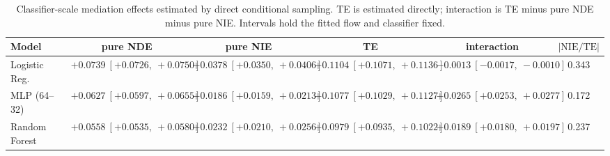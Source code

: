 \begin{table}[htbp]
  \centering
  \caption{Classifier-scale mediation effects estimated by direct conditional sampling. TE is estimated directly; interaction is TE minus pure NDE minus pure NIE. Intervals hold the fitted flow and classifier fixed.}
  \label{tab:acs_gap_overall}
  \begin{tabular}{lccccc}
    \toprule
    Model & pure NDE & pure NIE & TE & interaction & $|\mathrm{NIE}/\mathrm{TE}|$ \\
    \midrule
    Logistic Reg. & $+0.0739\ [+0.0726,\ +0.0750]$ & $+0.0378\ [+0.0350,\ +0.0406]$ & $+0.1104\ [+0.1071,\ +0.1136]$ & $-0.0013\ [-0.0017,\ -0.0010]$ & 0.343 \\
    MLP (64--32) & $+0.0627\ [+0.0597,\ +0.0655]$ & $+0.0186\ [+0.0159,\ +0.0213]$ & $+0.1077\ [+0.1029,\ +0.1127]$ & $+0.0265\ [+0.0253,\ +0.0277]$ & 0.172 \\
    Random Forest & $+0.0558\ [+0.0535,\ +0.0580]$ & $+0.0232\ [+0.0210,\ +0.0256]$ & $+0.0979\ [+0.0935,\ +0.1022]$ & $+0.0189\ [+0.0180,\ +0.0197]$ & 0.237 \\
    \bottomrule
  \end{tabular}
\end{table}